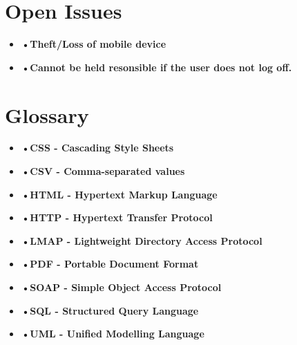 \documentclass[12pt]{article}
\begin{document}
 \section{Open Issues}
\begin{itemize}
  \item \textbf{•Theft/Loss of mobile device}
  \item \textbf{•Cannot be held resonsible if the user does not log off.}
\end{itemize}
 \section{Glossary} 
 \begin{itemize}
  \item \textbf{•CSS - Cascading Style Sheets}
  \item \textbf{•CSV - Comma-separated values}
  \item \textbf{•HTML - Hypertext Markup Language}
  \item \textbf{•HTTP - Hypertext Transfer Protocol}
  \item \textbf{•LMAP - Lightweight Directory Access Protocol}
  \item \textbf{•PDF - Portable Document Format}
  \item \textbf{•SOAP - Simple Object Access Protocol } 
  \item \textbf{•SQL - Structured Query Language}
  \item \textbf{•UML - Unified Modelling Language}
\end{itemize}
\end{document}
